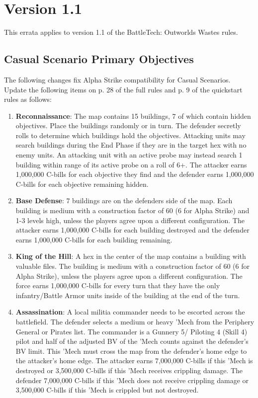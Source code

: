 \section{Version 1.1}

This errata applies to version 1.1 of the BattleTech: Outworlds Wastes rules.

\subsection{Casual Scenario Primary Objectives}

The following changes fix Alpha Strike compatibility for Casual Scenarios.
Update the following items on p. 28 of the full rules and p. 9 of the quickstart rules  as follows:

\begin{enumerate}

\item {\bfseries Reconnaissance}: The map contains 15 buildings, 7 of which contain hidden objectives.
Place the buildings randomly or in turn.
The defender secretly rolls to determine which buildings hold the objectives.
Attacking units may search buildings during the End Phase if they are in the target hex with no enemy units.
An attacking unit with an active probe may instead search 1 building within range of its active probe on a roll of 6+.
The attacker earns 1,000,000 C-bills for each objective they find and the defender earns 1,000,000 C-bills for each objective remaining hidden.

\setcounter{enumi}{3}
\item {\bfseries Base Defense}: 7 buildings are on the defenders side of the map.
Each building is medium with a construction factor of 60 (6 for Alpha Strike) and 1-3 levels high, unless the players agree upon a different configuration.
The attacker earns 1,000,000 C-bills for each building destroyed and the defender earns 1,000,000 C-bills for each building remaining.

\item {\bfseries King of the Hill}: A hex in the center of the map contains a building with valuable files.
The building is medium with a construction factor of 60 (6 for Alpha Strike), unless the players agree upon a different configuration.
The force earns 1,000,000 C-bills for every turn that they have the only infantry/Battle Armor units inside of the building at the end of the turn.

\item {\bfseries Assassination}: A local militia commander needs to be escorted across the battlefield.
The defender selects a medium or heavy 'Mech from the Periphery General or Pirates list.
The commander is a Gunnery 5/ Piloting 4 (Skill 4) pilot and half of the adjusted BV of the 'Mech counts against the defender's BV limit.
This 'Mech must cross the map from the defender's home edge to the attacker's home edge.
The attacker earns 7,000,000 C-bills if this 'Mech is destroyed or 3,500,000 C-bills if this 'Mech receives crippling damage.
The defender 7,000,000 C-bills if this 'Mech does not receive crippling damage or 3,500,000 C-bills if this 'Mech is crippled but not destroyed.

\end{enumerate}

